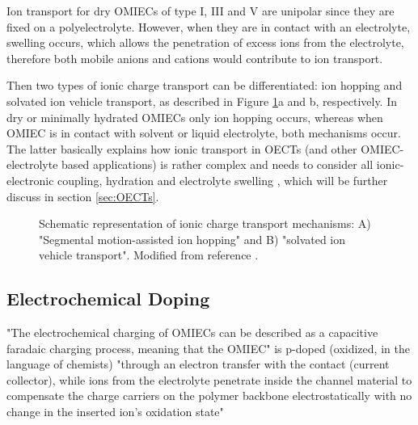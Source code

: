 Ion transport for dry OMIECs of type I, III and V are unipolar since they are fixed on a polyelectrolyte.  However, when they are in contact with an electrolyte, swelling occurs, which allows the penetration of excess ions from the electrolyte, therefore both mobile anions and cations would contribute to ion transport. 

Then two types of ionic charge transport can be differentiated: ion hopping and solvated ion vehicle transport, as described in Figure \ref{fig:itrans}a and b, respectively. In dry or minimally hydrated OMIECs only ion hopping occurs, whereas when OMIEC is in contact with solvent or liquid electrolyte, both mechanisms occur. The latter basically explains how ionic transport in OECTs (and other OMIEC-electrolyte based applications) is rather complex and needs to consider all ionic-electronic coupling, hydration and electrolyte swelling \cite{paulsenOrganicMixedIonic2020}, which will be further discuss in section \ref{sec:OECTs}.

\begin{figure}[ht]
	\centering
	\caption{Schematic representation of ionic charge transport mechanisms: A) "Segmental motion-assisted ion hopping" and B) "solvated ion vehicle transport". Modified from reference \cite{paulsenOrganicMixedIonic2020}.}
	\label{fig:itrans}
\end{figure}

\subsection{Electrochemical Doping}

"The electrochemical charging of OMIECs can be described as a capacitive faradaic charging process,
meaning that the OMIEC" is p-doped (oxidized, in the language of chemists) "through an electron transfer with the contact (current collector), while ions from the electrolyte penetrate inside the channel material to compensate the charge carriers on the polymer backbone electrostatically with no change in the inserted ion's oxidation state" \cite{giovannittiEnergeticControlRedoxActive2020}  




